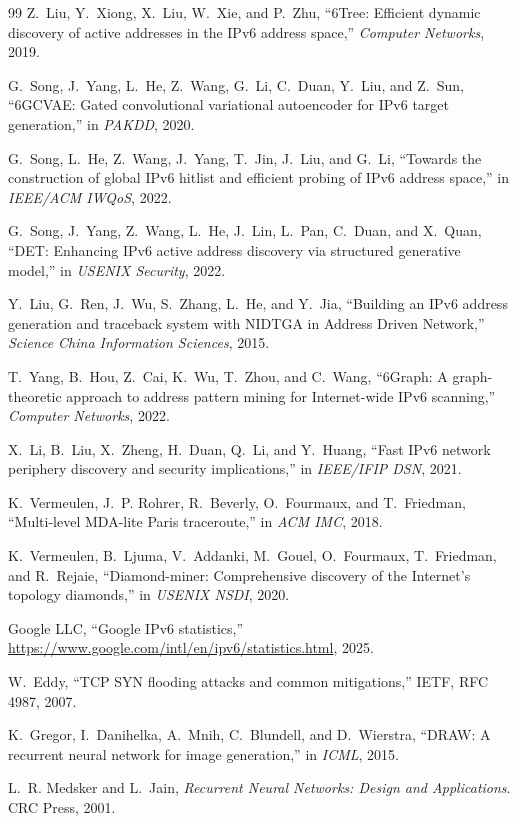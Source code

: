\documentclass[conference]{IEEEtran}
\begin{document}
\begin{thebibliography}{99}
Z.~Liu, Y.~Xiong, X.~Liu, W.~Xie, and P.~Zhu,
``6Tree: Efficient dynamic discovery of active addresses in the IPv6
address space,''
\emph{Computer Networks}, 2019.

G.~Song, J.~Yang, L.~He, Z.~Wang, G.~Li, C.~Duan, Y.~Liu, and Z.~Sun,
``6GCVAE: Gated convolutional variational autoencoder for IPv6
target generation,''
in \emph{PAKDD}, 2020.

G.~Song, L.~He, Z.~Wang, J.~Yang, T.~Jin, J.~Liu, and G.~Li,
``Towards the construction of global IPv6 hitlist and efficient
probing of IPv6 address space,''
in \emph{IEEE/ACM IWQoS}, 2022.

G.~Song, J.~Yang, Z.~Wang, L.~He, J.~Lin, L.~Pan, C.~Duan, and X.~Quan,
``DET: Enhancing IPv6 active address discovery via structured
generative model,''
in \emph{USENIX Security}, 2022.

Y.~Liu, G.~Ren, J.~Wu, S.~Zhang, L.~He, and Y.~Jia,
``Building an IPv6 address generation and traceback system with NIDTGA
in Address Driven Network,''
\emph{Science China Information Sciences}, 2015.

T.~Yang, B.~Hou, Z.~Cai, K.~Wu, T.~Zhou, and C.~Wang,
``6Graph: A graph-theoretic approach to address pattern mining for
Internet-wide IPv6 scanning,''
\emph{Computer Networks}, 2022.

X.~Li, B.~Liu, X.~Zheng, H.~Duan, Q.~Li, and Y.~Huang,
``Fast IPv6 network periphery discovery and security implications,''
in \emph{IEEE/IFIP DSN}, 2021.

K.~Vermeulen, J.~P. Rohrer, R.~Beverly, O.~Fourmaux, and T.~Friedman,
``Multi-level MDA-lite Paris traceroute,''
in \emph{ACM IMC}, 2018.

K.~Vermeulen, B.~Ljuma, V.~Addanki, M.~Gouel, O.~Fourmaux,
T.~Friedman, and R.~Rejaie,
``Diamond-miner: Comprehensive discovery of the Internet's topology
diamonds,''
in \emph{USENIX NSDI}, 2020.

Google LLC,
``Google IPv6 statistics,''
\url{https://www.google.com/intl/en/ipv6/statistics.html}, 2025.

W.~Eddy,
``TCP SYN flooding attacks and common mitigations,''
IETF, RFC 4987, 2007.

K.~Gregor, I.~Danihelka, A.~Mnih, C.~Blundell, and D.~Wierstra,
``DRAW: A recurrent neural network for image generation,''
in \emph{ICML}, 2015.

L.~R. Medsker and L.~Jain,
\emph{Recurrent Neural Networks: Design and Applications}.
CRC Press, 2001.

\end{thebibliography}
\end{document}
